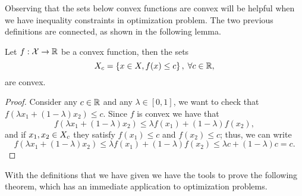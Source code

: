 Observing that the sets below convex functions are convex will be helpful when we have inequality constraints in optimization problem.
The two previous definitions are connected, as shown in the following lemma.
\begin{lemma}
    Let $f: \mathcal{X} \to \mathbb{R}$ be a convex function, then the sets
    $$X_c = \left\{x \in X, f(x) \leq c\right\}, \; \forall c \in \mathbb{R}, $$
    are convex.
\end{lemma}
\begin{proof}
    Consider any $c \in \mathbb{R}$ and any $\lambda \in [0, 1]$, we want to check that $f(\lambda x_1 + (1 - \lambda) x_2) \leq c$.
    Since $f$ is convex we have that 
    $$f\left(\lambda x_1 + (1 - \lambda) x_2 \right) \leq \lambda f(x_1) + (1 - \lambda) f(x_2) ,$$
    and if $x_1, x_2 \in X_c$ they satisfy
    $f(x_1) \leq c$ and $f(x_2) \leq c$; thus, we can write 
    $$f\left(\lambda x_1 + (1 - \lambda) x_2 \right) \leq \lambda f(x_1) + (1 - \lambda) f(x_2) \leq \lambda c + (1 - \lambda) c = c.$$
\end{proof}

With the definitions that we have given we have the tools to prove the following theorem, which has an immediate application to optimization problems.

